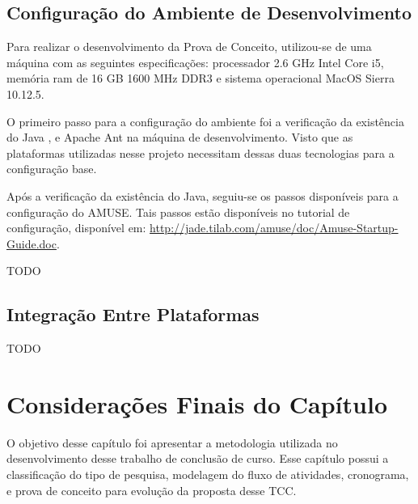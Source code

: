   \subsection{Configuração do Ambiente de Desenvolvimento}
  \label{subsec:configambiente}

  Para realizar o desenvolvimento da Prova de Conceito, utilizou-se de uma
  máquina com as seguintes especificações: processador 2.6 GHz Intel Core i5,
  memória ram de 16 GB 1600 MHz DDR3 e sistema operacional MacOS Sierra 10.12.5.

  O primeiro passo para a configuração do ambiente foi a verificação da
  existência do Java \cite{java}, e Apache Ant \cite{ant} na máquina de
  desenvolvimento. Visto que as plataformas utilizadas nesse projeto
  necessitam dessas duas tecnologias para a configuração base.

  Após a verificação da existência do Java, seguiu-se os passos disponíveis para
  a configuração do AMUSE. Tais passos estão disponíveis no tutorial de
  configuração, disponível em:
  \url{http://jade.tilab.com/amuse/doc/Amuse-Startup-Guide.doc}.


  TODO

  \subsection{Integração Entre Plataformas}
  \label{subsec:integracaoplataformas}
  TODO

\section{Considerações Finais do Capítulo}

O objetivo desse capítulo foi apresentar a metodologia utilizada no desenvolvimento
desse trabalho de conclusão de curso. Esse capítulo possui a classificação do tipo
de pesquisa, modelagem do fluxo de atividades, cronograma, e prova de conceito para
evolução da proposta desse TCC.
